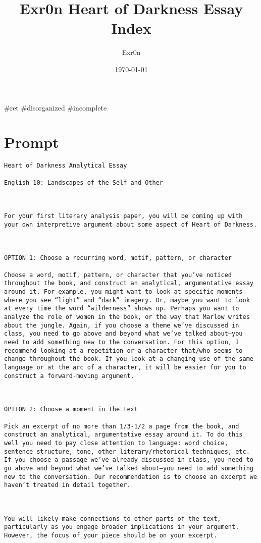 \documentclass[letterpaper]{article}
\author{Exr0n}
\date{\today}
\title{Exr0n Heart of Darkness Essay Index}
\renewcommand{\tableofcontents}{}
\begin{document}
\tableofcontents

\#ret \#disorganized \#incomplete

\section{Prompt}
\label{sec:orgf768cea}
\begin{verbatim}
Heart of Darkness Analytical Essay

English 10: Landscapes of the Self and Other



For your first literary analysis paper, you will be coming up with your own interpretive argument about some aspect of Heart of Darkness.



OPTION 1: Choose a recurring word, motif, pattern, or character

Choose a word, motif, pattern, or character that you’ve noticed throughout the book, and construct an analytical, argumentative essay around it. For example, you might want to look at specific moments where you see “light” and “dark” imagery. Or, maybe you want to look at every time the word “wilderness” shows up. Perhaps you want to analyze the role of women in the book, or the way that Marlow writes about the jungle. Again, if you choose a theme we’ve discussed in class, you need to go above and beyond what we’ve talked about—you need to add something new to the conversation. For this option, I recommend looking at a repetition or a character that/who seems to change throughout the book. If you look at a changing use of the same language or at the arc of a character, it will be easier for you to construct a forward-moving argument.



OPTION 2: Choose a moment in the text

Pick an excerpt of no more than 1/3-1/2 a page from the book, and construct an analytical, argumentative essay around it. To do this well you need to pay close attention to language: word choice, sentence structure, tone, other literary/rhetorical techniques, etc. If you choose a passage we’ve already discussed in class, you need to go above and beyond what we’ve talked about—you need to add something new to the conversation. Our recommendation is to choose an excerpt we haven’t treated in detail together. 



You will likely make connections to other parts of the text, particularly as you engage broader implications in your argument. However, the focus of your piece should be on your excerpt.




\end{verbatim}
\end{document}

